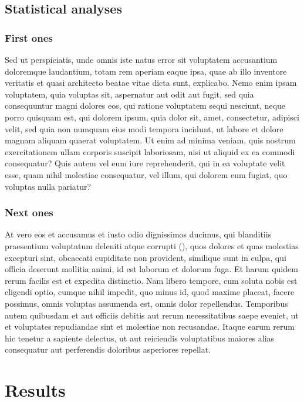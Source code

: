 \documentclass[a4paper,12pt]{article}
\begin{document}
\subsection*{Statistical analyses}

\subsubsection*{First ones}

Sed ut perspiciatis, unde omnis iste natus error sit voluptatem accusantium doloremque
laudantium, totam rem aperiam eaque ipsa, quae ab illo inventore veritatis et quasi
architecto beatae vitae dicta sunt, explicabo. Nemo enim ipsam voluptatem, quia voluptas
sit, aspernatur aut odit aut fugit, sed quia consequuntur magni dolores eos, qui ratione
voluptatem sequi nesciunt, neque porro quisquam est, qui dolorem ipsum, quia dolor sit,
amet, consectetur, adipisci velit, sed quia non numquam eius modi
tempora incidunt, ut labore et dolore magnam aliquam quaerat voluptatem. Ut enim ad minima
veniam, quis nostrum exercitationem ullam corporis suscipit laboriosam, nisi ut aliquid ex
ea commodi consequatur? Quis autem vel eum iure reprehenderit, qui in ea voluptate velit
esse, quam nihil molestiae consequatur, vel illum, qui dolorem eum fugiat, quo voluptas
nulla pariatur?

\subsubsection*{Next ones}

At vero eos et accusamus et iusto odio dignissimos ducimus, qui blanditiis praesentium
voluptatum deleniti atque corrupti (), quos dolores et quas molestias
excepturi sint, obcaecati cupiditate non provident, similique sunt in culpa, qui officia
deserunt mollitia animi, id est laborum et dolorum fuga. Et harum quidem rerum facilis est
et expedita distinctio. Nam libero tempore, cum soluta nobis est eligendi optio, cumque
nihil impedit, quo minus id, quod maxime placeat, facere possimus, omnis voluptas
assumenda est, omnis dolor repellendus. Temporibus autem quibusdam et
aut officiis debitis aut rerum necessitatibus saepe eveniet, ut et voluptates repudiandae
sint et molestiae non recusandae. Itaque earum rerum hic tenetur a sapiente delectus, ut
aut reiciendis voluptatibus maiores alias consequatur aut perferendis doloribus asperiores
repellat.

\section*{Results}
\end{document}
